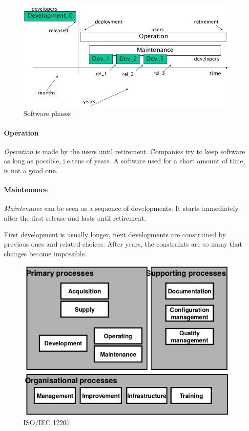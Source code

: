 \begin{figure}[hbtp]
\centering
\includegraphics[scale=0.4]{images/software_phases.jpg}
\caption{Software phases}
\end{figure}

\paragraph{Operation}
\emph{Operation} is made by the users until retirement. Companies try to keep software as long as possible, i.e.\@ tens of years. A software used for a short amount of time, is not a good one. 

\paragraph{Maintenance}
\emph{Maintenance} can be seen as a sequence of developments. It starts immediately after the first release and lasts until retirement.

First development is usually longer, next developments are constrained by previous ones and related choices. After years, the constraints are so many that changes become impossible.

\begin{figure}[hbtp]
\centering
\includegraphics[scale=0.4]{images/iso_iec_12207.png}
\caption{ISO/IEC 12207}
\end{figure}

